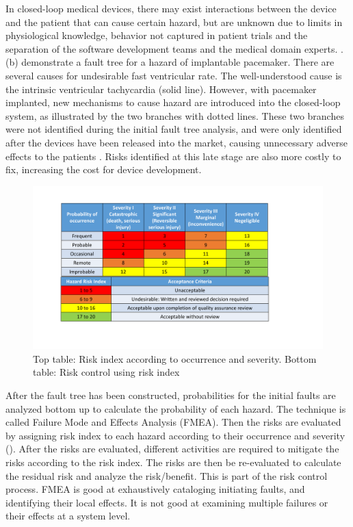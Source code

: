 In closed-loop medical devices, there may exist interactions between the device and the patient that can cause certain hazard, but are unknown due to limits in physiological knowledge, behavior not captured in patient trials and the separation of the software development teams and the medical domain experts. .(b) demonstrate a fault tree for a hazard of implantable pacemaker. There are several causes for undesirable fast ventricular rate. The well-understood cause is the intrinsic ventricular tachycardia (solid line). However, with pacemaker implanted, new mechanisms to cause hazard are introduced into the closed-loop system, as illustrated by the two branches with dotted lines. These two branches were not identified during the initial fault tree analysis, and were only identified after the devices have been released into the market, causing unnecessary adverse effects to the patients \cite{ELT}. Risks identified at this late stage are also more costly to fix, increasing the cost for device development. 
\begin{figure}[t]
		\centering
		\includegraphics[width=\textwidth]{figs/risk_analysis.pdf}
		\caption{Top table: Risk index according to occurrence and severity. Bottom table: Risk control using risk index}
		\label{fig:risk_ana}
\end{figure}

After the fault tree has been constructed, probabilities for the initial faults are analyzed bottom up to calculate the probability of each hazard. The technique is called Failure Mode and Effects Analysis (FMEA). Then the risks are evaluated by assigning risk index to each hazard according to their occurrence and severity (). After the risks are evaluated, different activities are required to mitigate the risks according to the risk index. The risks are then be re-evaluated to calculate the residual risk and analyze the risk/benefit. This is part of the risk control process. FMEA is good at exhaustively cataloging initiating faults, and identifying their local effects. It is not good at examining multiple failures or their effects at a system level.

